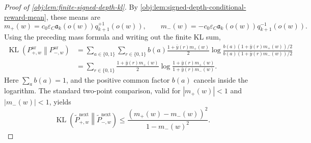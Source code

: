 \begin{proof}[Proof of \cref{obj:lem:finite-signed-depth-kl}]
By \cref{obj:lem:signed-depth-conditional-reward-mean}, these means are
\[
m_+(w)=c_0\varepsilon_C\mathfrak a_k(o(w))q_{k+1}^{+1}(o(w)),
\qquad
m_-(w)=-c_0\varepsilon_C\mathfrak a_k(o(w))q_{k+1}^{-1}(o(w)).
\]
Using the preceding mass formula and writing out the finite KL sum,
\[
\begin{aligned}
\operatorname{KL}\!\left(P_{+,w}^{\mathrm{ar}}\middle\|P_{-,w}^{\mathrm{ar}}\right)
&=
\sum_{a\in\{0,1\}}\sum_{r\in\{0,1\}}
 b(a)\frac{1+\bar y(r)m_+(w)}{2}
\log\frac{b(a)(1+\bar y(r)m_+(w))/2}{b(a)(1+\bar y(r)m_-(w))/2} \\
&=
\sum_{r\in\{0,1\}}
\frac{1+\bar y(r)m_+(w)}{2}
\log\frac{1+\bar y(r)m_+(w)}{1+\bar y(r)m_-(w)}.
\end{aligned}
\]
Here \(\sum_a b(a)=1\), and the positive common factor \(b(a)\) cancels inside the logarithm.  The standard two-point comparison, valid for \(|m_+(w)|<1\) and \(|m_-(w)|<1\), yields
\[
\operatorname{KL}\!\left(\widetilde P_{+,w}^{\mathrm{next}}\middle\|\widetilde P_{-,w}^{\mathrm{next}}\right)
\le
\frac{(m_+(w)-m_-(w))^2}{1-m_-(w)^2}.
\] %


\end{proof}
